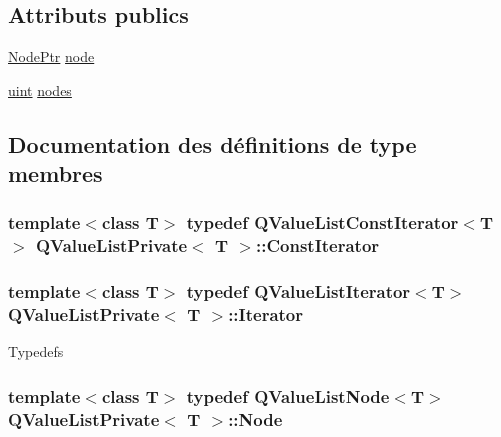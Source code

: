 \subsection*{Attributs publics}
\begin{DoxyCompactItemize}
\item 
\hyperlink{class_q_value_list_private_a63f9e5099e8c8445e00af7e3f4d7e274}{Node\+Ptr} \hyperlink{class_q_value_list_private_a9ee977645abf7fa39646bf46208439fd}{node}
\item 
\hyperlink{qglobal_8h_a4d3943ddea65db7163a58e6c7e8df95a}{uint} \hyperlink{class_q_value_list_private_a135ff8eff8b7a981761b17954c0a9b7a}{nodes}
\end{DoxyCompactItemize}


\subsection{Documentation des définitions de type membres}
\hypertarget{class_q_value_list_private_aeaccf04652d772f634ba78357a915b5c}{}
\subsubsection[{Const\+Iterator}]{\setlength{\rightskip}{0pt plus 5cm}template$<$class T$>$ typedef {\bf Q\+Value\+List\+Const\+Iterator}$<$T$>$ {\bf Q\+Value\+List\+Private}$<$ T $>$\+::{\bf Const\+Iterator}}\label{class_q_value_list_private_aeaccf04652d772f634ba78357a915b5c}
\hypertarget{class_q_value_list_private_aef9e14569c19defeaa2b6c8e636fafde}{}
\subsubsection[{Iterator}]{\setlength{\rightskip}{0pt plus 5cm}template$<$class T$>$ typedef {\bf Q\+Value\+List\+Iterator}$<$T$>$ {\bf Q\+Value\+List\+Private}$<$ T $>$\+::{\bf Iterator}}\label{class_q_value_list_private_aef9e14569c19defeaa2b6c8e636fafde}
Typedefs \hypertarget{class_q_value_list_private_a70ca1830018ed991cbd8d957ff62d10a}{}
\subsubsection[{Node}]{\setlength{\rightskip}{0pt plus 5cm}template$<$class T$>$ typedef {\bf Q\+Value\+List\+Node}$<$T$>$ {\bf Q\+Value\+List\+Private}$<$ T $>$\+::{\bf Node}}\label{class_q_value_list_private_a70ca1830018ed991cbd8d957ff62d10a}
\hypertarget{class_q_value_list_private_a63f9e5099e8c8445e00af7e3f4d7e274}{}
